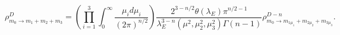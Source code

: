\begin{equation}
 \rho^{D}_{m_0\rightarrow m_1\!+m_2\!+m_3}\!=\!\!
 \left(\!\prod_{i=1}^3\!\int_0^\infty\!\frac{\mu_i d\mu_i}{(2\pi)^{n/2}}\!
 \right)\!\!\frac{2^{3-n/2}\theta(\lambda_E)\pi^{n/2-1}}
                    {\lambda_E^{3-n}(\mu^2,\mu_2^2,\mu_3^2)\Gamma(n\!-\!1)}
 \rho^{D-n}_{m_0\rightarrow m_{1\mu_1}\!+m_{2\mu_2}\!+m_{3\mu_3}}.
\end{equation}

